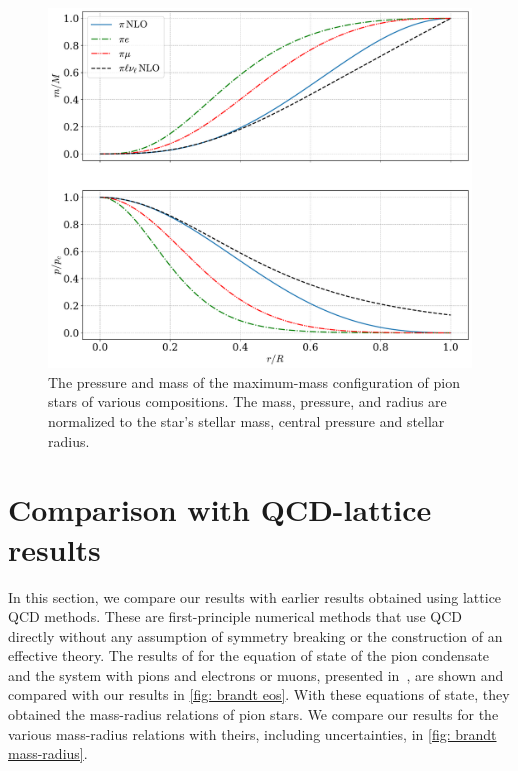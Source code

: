 \begin{figure}[p]
    \centering
    \includegraphics[width=.85\textwidth]{../scripts/figurer/pion_star/max_pressure_mass.pdf}
    \caption{
        The pressure and mass of the maximum-mass configuration of pion stars of various compositions.
        The mass, pressure, and radius are normalized to the star's stellar mass, central pressure and stellar radius.
        }
        \label{fig: max pressure and mass}
\end{figure}






\section{Comparison with QCD-lattice results}


In this section, we compare our results with earlier results obtained using lattice QCD methods.
These are first-principle numerical methods that use QCD directly without any assumption of symmetry breaking or the construction of an effective theory.
The results of \citeauthor{brandtNewClassCompact2018} for the equation of state of the pion condensate and the system with pions and electrons or muons, presented in~\autocite{brandtNewClassCompact2018}, are shown and compared with our results in \autoref{fig: brandt eos}.
With these equations of state, they obtained the mass-radius relations of pion stars.
We compare our results for the various mass-radius relations with theirs, including uncertainties, in \autoref{fig: brandt mass-radius}. 

